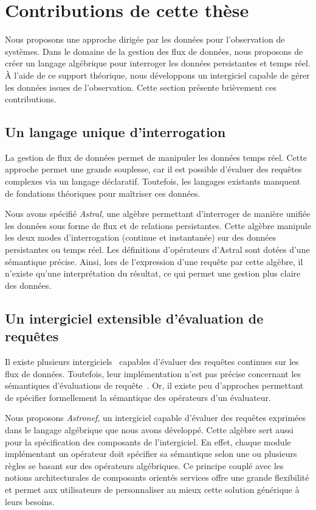 \section{Contributions de cette thèse}\label{sec:intro:demarche}
Nous proposons une approche dirigée par les données pour l'observation de systèmes. Dans le domaine de la gestion des flux de données, nous proposons de créer un langage algébrique pour interroger les données persistantes et temps réel. À l'aide de ce support théorique, nous développons un intergiciel capable de gérer les données issues de l'observation. Cette section présente brièvement ces contributions.

\subsection{Un langage unique d'interrogation}
La gestion de flux de données permet de manipuler les données temps réel. Cette approche permet une grande souplesse, car il est possible d'évaluer des requêtes complexes via un langage déclaratif. Toutefois, les langages existants manquent de fondations théoriques pour maîtriser ces données.

Nous avons spécifié \textit{Astral}, une algèbre permettant d'interroger de manière unifiée les données sous forme de flux et de relations persistantes. Cette algèbre manipule les deux modes d'interrogation (continue et instantanée) sur des données persistantes ou temps réel. Les définitions d'opérateurs d'Astral sont dotées d'une sémantique précise. Ainsi, lors de l'expression d'une requête par cette algèbre, il n'existe qu'une interprétation du résultat, ce qui permet une gestion plus claire des données.

\subsection{Un intergiciel extensible d'évaluation de requêtes}
Il existe plusieurs intergiciels~\cite{Arasu:stream,url:aleri} capables d'évaluer des requêtes continues sur les flux de données. Toutefois, leur implémentation n'est pas précise concernant les sémantiques d'évaluations de requête~\cite{Jain:spread,Botan:secret}. Or, il existe peu d'approches permettant de spécifier formellement la sémantique des opérateurs d'un évaluateur.

Nous proposons \textit{Astronef}, un intergiciel capable d'évaluer des requêtes exprimées dans le langage algébrique que nous avons développé. Cette algèbre sert aussi pour la spécification des composants de l'intergiciel. En effet, chaque module implémentant un opérateur doit spécifier sa sémantique selon une ou plusieurs règles se basant sur des opérateurs algébriques. Ce principe couplé avec les notions architecturales de composants orientés services offre une grande flexibilité et permet aux utilisateurs de personnaliser au mieux cette solution générique à leurs besoins.

